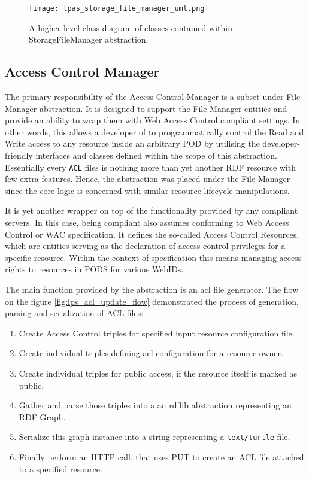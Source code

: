 \begin{figure}[h]
\centering
\texttt{[image: lpas\_storage\_file\_manager\_uml.png]}
\caption{A higher level class diagram of classes contained within StorageFileManager abstraction.}
\label{fig:lps_file_manager_class_uml}
\end{figure}


\subsection{Access Control Manager}

The primary responsibility of the Access Control Manager is a subset under File Manager abstraction. It is designed to support the File Manager entities and provide an ability to wrap them with Web Access Control compliant settings. In other words, this allows a developer of \lpa{} to programmatically control the Read and Write access to any resource inside an arbitrary \solid{} POD by utilising the developer-friendly interfaces and classes defined within the scope of this abstraction. Essentially every \texttt{ACL} files is nothing more than yet another RDF resource with few extra features. Hence, the abstraction was placed under the File Manager since the core logic is concerned with similar resource lifecycle manipulations.

It is yet another wrapper on top of the functionality provided by any \solid{} compliant servers. In this case, being \solid{} compliant also assumes conforming to Web Access Control or WAC specification. It defines the so-called Access Control Resources, which are entities serving as the declaration of access control privileges for a specific resource. Within the context of \solid{} specification this means managing access rights to resources in \solid{} PODS for various WebIDs.

The main function provided by the abstraction is an acl file generator. The flow on the figure \ref{fig:lps_acl_update_flow} demonstrated the process of generation, parsing and serialization of ACL files: 

\begin{enumerate}
	\item Create Access Control triples for specified input resource configuration file.
	\item Create individual triples defining acl configuration for a resource owner.
	\item Create individual triples for public access, if the resource itself is marked as public.
	\item Gather and parse those triples into a an rdflib abstraction representing an RDF Graph.
	\item Serialize this graph instance into a string representing a \texttt{text/turtle} file.
	\item Finally perform an HTTP call, that uses PUT to create an ACL file attached to a specified resource.
\end{enumerate}

